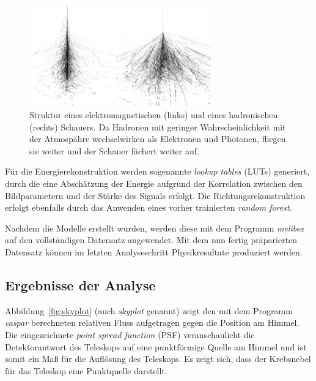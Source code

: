 \begin{figure}
  \centering
  \includegraphics[width=0.7\textwidth]{figures/gamma_hadron.png}
  \caption{Struktur eines elektromagnetischen (links) und eines hadronischen
  (rechts) Schauers. Da Hadronen mit geringer Wahrscheinlichkeit mit der
  Atmospähre wechselwirken als Elektronen und Photonen, fliegen sie weiter und
  der Schauer fächert weiter auf.}
  \label{fig:gamma_hadron}
\end{figure}

Für die Energierekonstruktion werden sogenannte \textit{lookup tables} (LUTs)
generiert, durch die eine Abschätzung der Energie aufgrund der Korrelation
zwischen den Bildparametern und der Stärke des Signals erfolgt. Die
Richtungsrekonstruktion erfolgt ebenfalls durch das Anwenden eines vorher
trainierten \textit{random forest}.

Nachdem die Modelle erstellt wurden, werden diese mit dem Programm
\textit{melibea} auf den vollständigen Datensatz angewendet. Mit dem nun fertig
präparierten Datensatz können im letzten Analyseschritt Physikresultate
produziert werden.

\subsection{Ergebnisse der Analyse}

Abbildung~\ref{fig:skyplot} (auch \textit{skyplot} genannt) zeigt den mit dem
Programm \textit{caspar} berechneten relativen Fluss aufgetragen gegen die
Position am Himmel. Die eingezeichnete \textit{point spread function} (PSF)
veranschaulicht die Detektorantwort des Teleskops auf eine punktförmige Quelle
am Himmel und ist somit ein Maß für die Auflösung des Teleskops. Es zeigt sich,
dass der Krebsnebel für das Teleskop eine Punktquelle darstellt.

